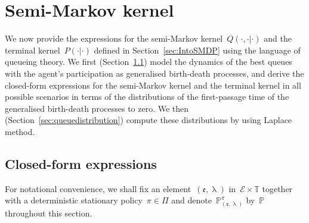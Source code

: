 \documentclass{amsart}[11pt]
\numberwithin{equation}{section}
\theoremstyle{definition}
\newcommand{\PP}{\mathbb{P}}
\newcommand{\Ee}{\mathcal{E}}
\newcommand{\TT}{\mathbb{T}}
\newcommand{\ee}{\mathfrak{e}}
\begin{document}
\section{Semi-Markov kernel}\label{Section:SemiMarkovKernel}
We now provide the expressions for the semi-Markov kernel~$Q(\cdot, \cdot\lvert \cdot)$ 
and the terminal kernel~$P(\cdot\lvert \cdot)$
defined in Section~\ref{sec:IntoSMDP} using the language of queueing theory.
We first (Section~\ref{sec:closedformSMK}) model the dynamics of the best queues 
with the agent's participation as generalised birth-death processes, 
and derive the closed-form expressions for the semi-Markov kernel 
and the terminal kernel in all possible scenarios
in terms of the distributions of the first-passage time of the generalised birth-death processes to zero.
We then (Section~\ref{sec:queuedistribution}) compute these distributions by using Laplace method. 
\subsection{Closed-form expressions}\label{sec:closedformSMK}
For notational convenience, we shall fix an element~$(\ee, \uplambda)$ in~$\Ee\times\TT$ 
together with a deterministic stationary policy~$\pi\in\Pi$
and denote~$\PP^{\pi}_{(\ee, \uplambda)}$ by~$\PP$
throughout this section.
\end{document}

